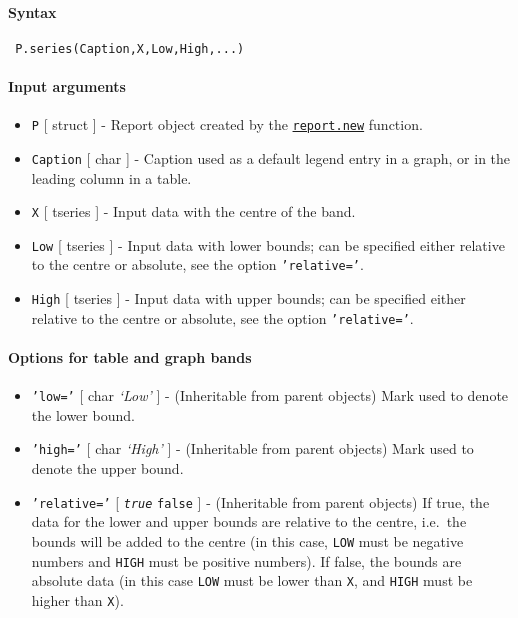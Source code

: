 


	\paragraph{Syntax}
 
 \begin{verbatim}
 P.series(Caption,X,Low,High,...)
 \end{verbatim}
 
 \paragraph{Input arguments}
 
 \begin{itemize}
 \item
   \texttt{P} {[} struct {]} - Report object created by the
   \href{report/new}{\texttt{report.new}} function.
 \item
   \texttt{Caption} {[} char {]} - Caption used as a default legend entry
   in a graph, or in the leading column in a table.
 \item
   \texttt{X} {[} tseries {]} - Input data with the centre of the band.
 \item
   \texttt{Low} {[} tseries {]} - Input data with lower bounds; can be
   specified either relative to the centre or absolute, see the option
   \texttt{'relative='}.
 \item
   \texttt{High} {[} tseries {]} - Input data with upper bounds; can be
   specified either relative to the centre or absolute, see the option
   \texttt{'relative='}.
 \end{itemize}
 
 \paragraph{Options for table and graph bands}
 
 \begin{itemize}
 \item
   \texttt{'low='} {[} char \textbar{} \emph{`Low'} {]} - (Inheritable
   from parent objects) Mark used to denote the lower bound.
 \item
   \texttt{'high='} {[} char \textbar{} \emph{`High'} {]} - (Inheritable
   from parent objects) Mark used to denote the upper bound.
 \item
   \texttt{'relative='} {[} \emph{\texttt{true}} \textbar{}
   \texttt{false} {]} - (Inheritable from parent objects) If true, the
   data for the lower and upper bounds are relative to the centre,
   i.e.~the bounds will be added to the centre (in this case,
   \texttt{LOW} must be negative numbers and \texttt{HIGH} must be
   positive numbers). If false, the bounds are absolute data (in this
   case \texttt{LOW} must be lower than \texttt{X}, and \texttt{HIGH}
   must be higher than \texttt{X}).
 \end{itemize}
 
